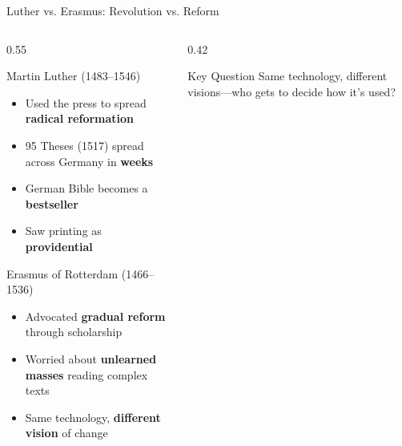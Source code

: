 \documentclass[aspectratio=169]{beamer}
\begin{document}
\begin{frame}{Luther vs. Erasmus: Revolution vs. Reform}
\begin{columns}
\begin{column}{0.55\textwidth}
\begin{block}{Martin Luther (1483--1546)}
\begin{itemize}
  \item Used the press to spread \textbf{radical reformation}
  \item 95 Theses (1517) spread across Germany in \textbf{weeks}
  \item German Bible becomes a \textbf{bestseller}
  \item Saw printing as \textbf{providential}
\end{itemize}
\end{block}

\begin{alertblock}{Erasmus of Rotterdam (1466--1536)}
\begin{itemize}
  \item Advocated \textbf{gradual reform} through scholarship
  \item Worried about \textbf{unlearned masses} reading complex texts
  \item Same technology, \textbf{different vision} of change
\end{itemize}
\end{alertblock}
\end{column}

\begin{column}{0.42\textwidth}

\vspace{1em}
\begin{exampleblock}{Key Question}
Same technology, different visions---who gets to decide how it's used?
\end{exampleblock}
\end{column}
\end{columns}
\end{frame}
\end{document}

